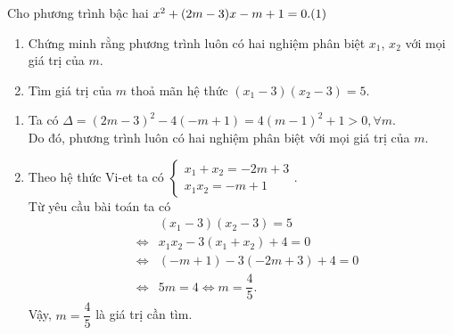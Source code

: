 \begin{ex}%
	Cho phương trình bậc hai $x^2+(2m-3)x-m+1=0. \hfill (1)$
	\begin{enumerate}
		\item Chứng minh rằng phương trình luôn có hai nghiệm phân biệt $x_1$, $x_2$ với mọi giá trị của $m$.
		\item Tìm giá trị của $m$ thoả mãn hệ thức $(x_1-3)(x_2-3)=5$.
	\end{enumerate}
	\loigiai
	{
	\begin{enumerate}
		\item Ta có $\Delta = (2m-3)^2 -4(-m+1) = 4(m-1)^2 + 1 > 0, \forall m.$\\
		Do đó, phương trình luôn có hai nghiệm phân biệt với mọi giá trị của $m$.
		\item Theo hệ thức Vi-et ta có
		$\begin{cases} x_1+x_2=-2m+3\\ x_1x_2=-m+1 \end{cases}$.\\
		Từ yêu cầu bài toán ta có
		\begin{eqnarray*}
			& &(x_1-3)(x_2-3)= 5\\
			&\Leftrightarrow &x_1x_2 - 3(x_1+x_2)+4=0\\
			&\Leftrightarrow &(-m+1) - 3(-2m+3)+4=0\\
			&\Leftrightarrow &5m=4 \Leftrightarrow m=\dfrac{4}{5}.
		\end{eqnarray*}	
		Vậy, $m=\dfrac{4}{5}$ là giá trị cần tìm.
	\end{enumerate}
}
\end{ex}


